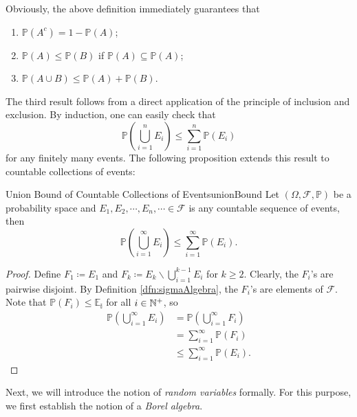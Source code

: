 \documentclass[math]{amznotes}
\theoremstyle{remark}
\begin{document}
Obviously, the above definition immediately guarantees that 
\begin{enumerate}
    \item $\mathbb{P}\left(A^c\right) = 1 - \mathbb{P}\left(A\right)$;
    \item $\mathbb{P}\left(A\right) \leq \mathbb{P}\left(B\right)$ if $\mathbb{P}\left(A\right) \subseteq \mathbb{P}\left(A\right)$;
    \item $\mathbb{P}\left(A \cup B\right) \leq \mathbb{P}\left(A\right) + \mathbb{P}\left(B\right)$.
\end{enumerate}
The third result follows from a direct application of the principle of inclusion and exclusion. By induction, one can easily check that 
\begin{equation*}
    \mathbb{P}\left(\bigcup_{i = 1}^{n}E_i\right) \leq \sum_{i = 1}^{n}\mathbb{P}\left(E_i\right)
\end{equation*}
for any finitely many events. The following proposition extends this result to countable collections of events:
\begin{probox}{Union Bound of Countable Collections of Events}{unionBound}
    Let $\left(\Omega, \mathcal{F}, \mathbb{P}\right)$ be a probability space and $E_1, E_2, \cdots, E_n, \cdots \in \mathcal{F}$ is any countable sequence of events, then 
    \begin{equation*}
        \mathbb{P}\left(\bigcup_{i = 1}^{\infty}E_i\right) \leq \sum_{i = 1}^{\infty}\mathbb{P}\left(E_i\right).
    \end{equation*}
    \tcblower
    \begin{proof}
        Define $F_1 \coloneqq E_1$ and $F_k \coloneqq E_k \backslash \bigcup_{i = 1}^{k - 1}E_i$ for $k \geq 2$. Clearly, the $F_i$'s are pairwise disjoint. By Definition \ref{dfn:sigmaAlgebra}, the $F_i$'s are elements of $\mathcal{F}$. Note that $\mathbb{P}\left(F_i\right) \leq \mathbb{E_i}$ for all $i \in \mathbb{N}^+$, so 
        \begin{align*}
            \mathbb{P}\left(\bigcup_{i = 1}^{\infty}E_i\right) & = \mathbb{P}\left(\bigcup_{i = 1}^{\infty}F_i\right) \\
            & = \sum_{i = 1}^{\infty}\mathbb{P}\left(F_i\right) \\
            & \leq \sum_{i = 1}^{\infty}\mathbb{P}\left(E_i\right).
        \end{align*}
    \end{proof}
\end{probox}
Next, we will introduce the notion of \textit{random variables} formally. For this purpose, we first establish the notion of a \textit{Borel algebra}.
\end{document}

